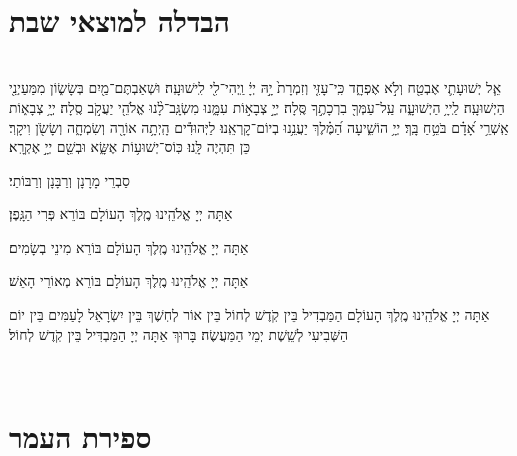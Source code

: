 \documentclass[twoside, openany, parskip=half, 11pt]{book}
\begin{document}
 \\


\section[הבדלה]{ הבדלה למוצאי שבת } \label{havdala}

\\
אֵ֧ל יְשׁוּעָתִ֛י אֶבְטַ֖ח וְלֹ֣א אֶפְחָ֑ד כִּֽי־עָזִּ֤י וְזִמְרָת֙ יָ֣הּ יְיָ֔ וַֽיְהִי־לִ֖י לִֽישׁוּעָֽה׃
וּשְׁאַבְתֶּם־מַ֖יִם בְּשָׂשׂ֑וֹן מִמַּעַיְנֵ֖י הַיְשׁוּעָֽה׃
לַֽייָ֥ הַיְשׁוּעָ֑ה עַֽל־עַמְּךָ֖ בִרְכָתֶ֣ךָ סֶּֽלָה׃
יְיָ֣ צְבָא֣וֹת עִמָּ֑נוּ מִשְׂגָּֽב־לָ֨נוּ אֱלֹהֵ֖י יַעֲקֹ֣ב סֶֽלָה׃
יְיָ֥ צְבָא֑וֹת אַֽשְׁרֵ֥י אָ֝דָ֗ם בֹּטֵ֥חַ בָּֽךְ׃
יְיָ֥ הוֹשִׁ֑יעָה הַ֝מֶּ֗לֶךְ יַעֲנֵ֥נוּ בְיוֹם־קׇרְאֵֽנוּ׃
לַיְּהוּדִ֕ים הָֽיְתָ֥ה אוֹרָ֖ה וְשִׂמְחָ֑ה וְשָׂשֹׂ֖ן וִיקָֽר׃ כֵּן תִּהְיֶה לָּֽנוּ׃ כּֽוֹס־יְשׁוּע֥וֹת אֶשָּׂ֑א וּבְשֵׁ֖ם יְיָ֣ אֶקְרָֽא׃

\begin{scriptsize}
סַבְרֵי מָרָנָן וְרַבָּנָן וְרַבּוֹתַי׃ \\
\end{scriptsize}
אַתָּה יְיָ אֱלֹהֵֽינוּ מֶֽלֶךְ הָעוֹלָם בּוֹרֵא פְּרִי הַגָּֽפֶן׃

אַתָּה יְיָ אֱלֹהֵֽינוּ מֶֽלֶךְ הָעוֹלָם בּוֹרֵא מִינֵי בְשָׂמִים׃

אַתָּה יְיָ אֱלֹהֵֽינוּ מֶֽלֶךְ הָעוֹלָם בּוֹרֵא מְאוֹרֵי הָאֵשׁ׃

אַתָּה יְיָ אֱלֹהֵֽינוּ מֶֽלֶךְ הָעוֹלָם הַמַּבְדִיל בֵּין קֹֽדֶשׁ לְחוֹל בֵּין אוֹר לְחֽשֶׁךְ בֵּין יִשְׂרָאֵל לָעַמִּים בֵּין יוֹם הַשְּׁבִיעִי לְשֵֽׁשֶׁת יְמֵי הַמַּעֲשֶׂה׃ בָּרוּךְ אַתָּה יְיָ הַמַּבְדִּיל בֵּין קֹֽדֶשׁ לְחוֹל׃
\clearpage

\vspace{-1.3\baselineskip}










\quad{}\quad{}\\

\section{ספירת העמר}
\label{sefiras haomer}
\end{document}
